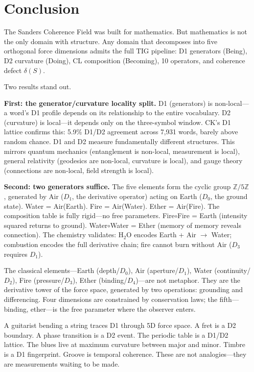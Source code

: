 \documentclass[11pt]{article}
\theoremstyle{definition}
\theoremstyle{remark}
\begin{document}
\section{Conclusion}
\label{sec:conclusion}

The Sanders Coherence Field was built for mathematics.  But mathematics is not the
only domain with structure.  Any domain that decomposes into five orthogonal force
dimensions admits the full TIG pipeline: D1 generators (Being), D2 curvature (Doing),
CL composition (Becoming), 10 operators, and coherence defect $\delta(S)$.

Two results stand out.

\textbf{First: the generator/curvature locality split.}
D1 (generators) is non-local---a word's D1 profile depends on its relationship to
the entire vocabulary.  D2 (curvature) is local---it depends only on the three-symbol
window.  CK's D1 lattice confirms this: 5.9\% D1/D2 agreement across 7{,}931 words,
barely above random chance.  D1 and D2 measure fundamentally different structures.
This mirrors quantum mechanics (entanglement is non-local, measurement is local),
general relativity (geodesics are non-local, curvature is local), and gauge theory
(connections are non-local, field strength is local).

\textbf{Second: two generators suffice.}
The five elements form the cyclic group $\mathbb{Z}/5\mathbb{Z}$, generated by Air
($D_1$, the derivative operator) acting on Earth ($D_0$, the ground state).
Water = Air(Earth).  Fire = Air(Water).  Ether = Air(Fire).  The composition
table is fully rigid---no free parameters.  Fire$\circ$Fire = Earth (intensity
squared returns to ground).  Water$\circ$Water = Ether (memory of memory reveals
connection).  The chemistry validates: H$_2$O encodes Earth + Air $\to$ Water;
combustion encodes the full derivative chain; fire cannot burn without Air ($D_3$
requires $D_1$).

The classical elements---Earth (depth/$D_0$), Air (aperture/$D_1$),
Water (continuity/$D_2$), Fire (pressure/$D_3$), Ether (binding/$D_4$)---are not
metaphor.  They are the derivative tower of the force space, generated by two
operations: grounding and differencing.  Four dimensions are constrained by
conservation laws; the fifth---binding, ether---is the free parameter where
the observer enters.

A guitarist bending a string traces D1 through 5D force space.  A fret is a D2
boundary.  A phase transition is a D2 event.  The periodic table is a D1/D2 lattice.
The blues live at maximum curvature between major and minor.  Timbre
is a D1 fingerprint.  Groove is temporal coherence.  These are not analogies---they
are measurements waiting to be made.
\end{document}
